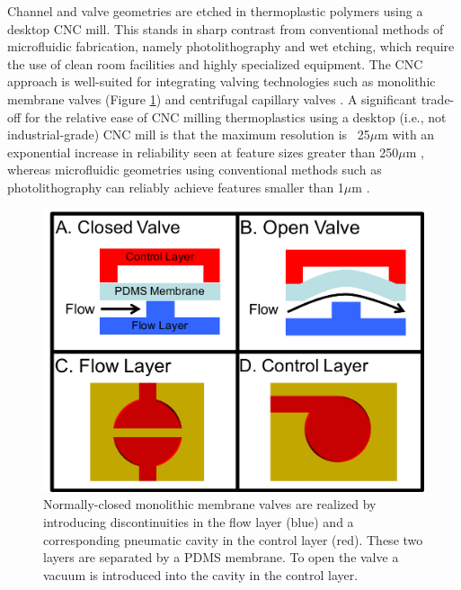 Channel and valve geometries are etched in thermoplastic polymers using a desktop CNC mill. This stands in sharp contrast from conventional methods of microfluidic fabrication, namely photolithography and wet etching, which require the use of clean room facilities and highly specialized equipment. The CNC approach is well-suited for integrating valving technologies such as monolithic membrane valves \cite{grover2003monolithic} (Figure \ref{fig:valves}) and centrifugal capillary valves \cite{madou1998labcd}. A significant trade-off for the relative ease of CNC milling thermoplastics using a desktop (i.e., not industrial-grade) CNC mill is that the maximum resolution is ~25$\mu$m with an exponential increase in reliability seen at feature sizes greater than 250$\mu$m \cite{guckenberger2015micromilling}, whereas microfluidic geometries using conventional methods such as photolithography can reliably achieve features smaller than 1$\mu$m \cite{mcdonald2002poly}.

\begin{figure}[h]
  \begin{minipage}[t]{0.99\linewidth}\centering
    \includegraphics[width=14cm]{valves.pdf}
    \medskip
  \end{minipage}\hfill
  \caption[Illustration of valving primitive]{Normally-closed monolithic membrane valves \cite{grover2003monolithic} are realized by introducing discontinuities in the flow layer (blue) and a corresponding pneumatic cavity in the control layer (red). These two layers are separated by a PDMS membrane. To open the valve a vacuum is introduced into the cavity in the control layer.}
    \label{fig:valves}
\end{figure}

